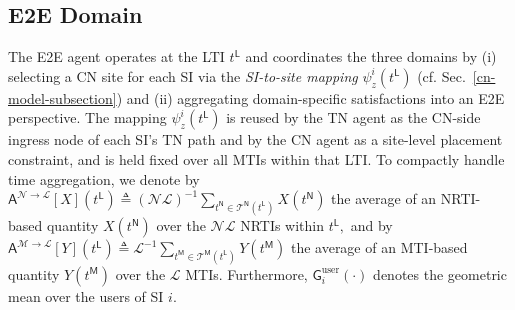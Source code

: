 \documentclass[12pt,lettersize,journal,onecolumn]{IEEEtran}
\begin{document}
\subsection{E2E Domain} \label{e2e-domain-section}
The E2E agent operates at the LTI $t^\mathsf{L}$ and coordinates the three domains by (i) selecting a CN site for each SI via the \textit{SI-to-site mapping} ${\psi}^{i}_{z}(t^\mathsf{L})$ (cf. Sec.~\ref{cn-model-subsection}) and (ii) aggregating domain-specific satisfactions into an E2E perspective. The mapping ${\psi}^{i}_{z}(t^\mathsf{L})$ is reused by the TN agent as the CN-side ingress node of each SI’s TN path and by the CN agent as a site-level placement constraint, and is held fixed over all MTIs within that LTI.
To compactly handle time aggregation, we denote by
$\mathsf{A}^{\mathscr{N}\rightarrow\mathscr{L}}[X](t^\mathsf{L}) \triangleq (\mathscr{N}\mathscr{L})^{-1}\sum_{t^\mathsf{N}\in\mathcal{T}^\mathsf{N}(t^\mathsf{L})}X(t^\mathsf{N})$
the average of an NRTI-based quantity $X(t^\mathsf{N})$ over the $\mathscr{N}\mathscr{L}$ NRTIs within $t^\mathsf{L},$ and by
$\mathsf{A}^{\mathscr{M}\rightarrow\mathscr{L}}[Y](t^\mathsf{L}) \triangleq \mathscr{L}^{-1}\sum_{t^\mathsf{M}\in\mathcal{T}^\mathsf{M}(t^\mathsf{L})}Y(t^\mathsf{M})$
the average of an MTI-based quantity $Y(t^\mathsf{M})$ over the $\mathscr{L}$ MTIs. Furthermore, $\mathsf{G}^{\mathrm{user}}_{i}(\cdot)$ denotes the geometric mean over the users of SI $i$.

\end{document}
